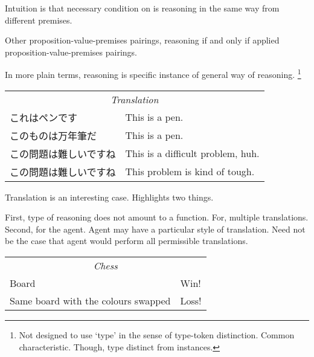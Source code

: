 \begin{note}
\begin{definition}[\sR{2}]
    Intuition is that necessary condition on \sR{} is reasoning in the same way from different premises.

    Other proposition-value-premises pairings, reasoning if and only if applied proposition-value-premises pairings.
  \end{definition}

  In more plain terms, reasoning is specific instance of general way of reasoning.%
  \footnote{
    Not designed to use `type' in the sense of type-token distinction.
    Common characteristic.
    Though, type distinct from instances.
  }
\end{note}

\begin{note}
  \begin{center}
    \begin{tabular}[h]{p{.55\linewidth}|p{.4\linewidth}}
      \multicolumn{2}{c}{\emph{Translation}} \\
      これはペンです & This is a pen. \\
      このものは万年筆だ & This is a pen. \\
      この問題は難しいですね & This is a difficult problem, huh. \\
      この問題は難しいですね & This problem is kind of tough. \\
    \end{tabular}
  \end{center}

  Translation is an interesting case.
  Highlights two things.

  First, type of reasoning does not amount to a function.
  For, multiple translations.
  Second, for the agent.
  Agent may have a particular style of translation.
  Need not be the case that agent would perform all permissible translations.
\end{note}

\begin{note}
  \begin{center}
    \begin{tabular}[h]{p{.55\linewidth}|p{.4\linewidth}}
      \multicolumn{2}{c}{\emph{Chess}} \\
      Board & Win! \\
      Same board with the colours swapped & Loss! \\
    \end{tabular}
  \end{center}
\end{note}

